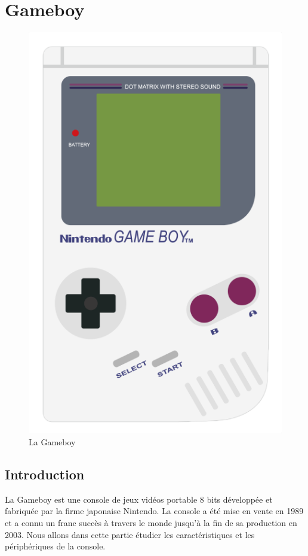 \documentclass[a4paper]{article}
\begin{document}
\newpage


\section{Gameboy}

\begin{figure}[!h]
  \centering
  \includegraphics[scale=0.5]{images/gameboy.png}
  \caption{La Gameboy}
\end{figure}

\subsection{Introduction}
La Gameboy est une console de jeux vidéos portable 8 bits développée et fabriquée
par la firme japonaise Nintendo. La console a été mise en vente en 1989 et a connu
un franc succès à travers le monde jusqu'à la fin de sa production en 2003.
Nous allons dans cette partie étudier les caractéristiques et les périphériques
de la console. \\
\end{document}
